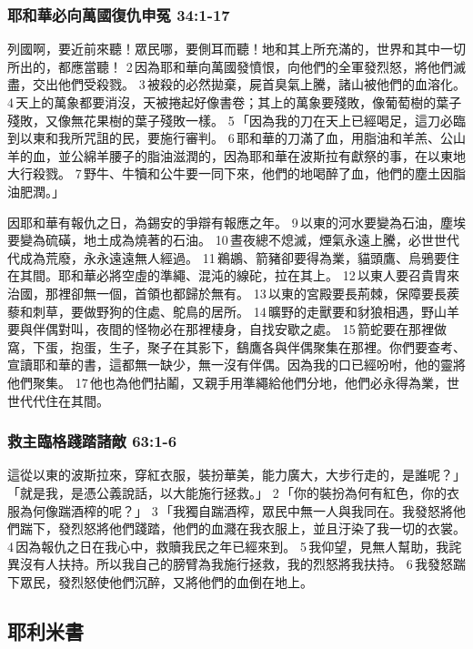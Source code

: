 \subsubsection{耶和華必向萬國復仇申冤 34:1-17}
列國啊，要近前來聽！眾民哪，要側耳而聽！地和其上所充滿的，世界和其中一切所出的，都應當聽！ 2 因為耶和華向萬國發憤恨，向他們的全軍發烈怒，將他們滅盡，交出他們受殺戮。 3 被殺的必然拋棄，屍首臭氣上騰，諸山被他們的血溶化。 4 天上的萬象都要消沒，天被捲起好像書卷；其上的萬象要殘敗，像葡萄樹的葉子殘敗，又像無花果樹的葉子殘敗一樣。 5 「因為我的刀在天上已經喝足，這刀必臨到以東和我所咒詛的民，要施行審判。 6 耶和華的刀滿了血，用脂油和羊羔、公山羊的血，並公綿羊腰子的脂油滋潤的，因為耶和華在波斯拉有獻祭的事，在以東地大行殺戮。 7 野牛、牛犢和公牛要一同下來，他們的地喝醉了血，他們的塵土因脂油肥潤。」

因耶和華有報仇之日，為錫安的爭辯有報應之年。 9 以東的河水要變為石油，塵埃要變為硫磺，地土成為燒著的石油。 10 晝夜總不熄滅，煙氣永遠上騰，必世世代代成為荒廢，永永遠遠無人經過。 11 鵜鶘、箭豬卻要得為業，貓頭鷹、烏鴉要住在其間。耶和華必將空虛的準繩、混沌的線砣，拉在其上。 12 以東人要召貴胄來治國，那裡卻無一個，首領也都歸於無有。 13 以東的宮殿要長荊棘，保障要長蒺藜和刺草，要做野狗的住處、鴕鳥的居所。 14 曠野的走獸要和豺狼相遇，野山羊要與伴偶對叫，夜間的怪物必在那裡棲身，自找安歇之處。 15 箭蛇要在那裡做窩，下蛋，抱蛋，生子，聚子在其影下，鷂鷹各與伴偶聚集在那裡。你們要查考、宣讀耶和華的書，這都無一缺少，無一沒有伴偶。因為我的口已經吩咐，他的靈將他們聚集。 17 他也為他們拈鬮，又親手用準繩給他們分地，他們必永得為業，世世代代住在其間。

\subsubsection{救主臨格踐踏諸敵 63:1-6}
這從以東的波斯拉來，穿紅衣服，裝扮華美，能力廣大，大步行走的，是誰呢？」「就是我，是憑公義說話，以大能施行拯救。」 2 「你的裝扮為何有紅色，你的衣服為何像踹酒榨的呢？」 3 「我獨自踹酒榨，眾民中無一人與我同在。我發怒將他們踹下，發烈怒將他們踐踏，他們的血濺在我衣服上，並且汙染了我一切的衣裳。 4 因為報仇之日在我心中，救贖我民之年已經來到。 5 我仰望，見無人幫助，我詫異沒有人扶持。所以我自己的膀臂為我施行拯救，我的烈怒將我扶持。 6 我發怒踹下眾民，發烈怒使他們沉醉，又將他們的血倒在地上。

\subsection{耶利米書}

